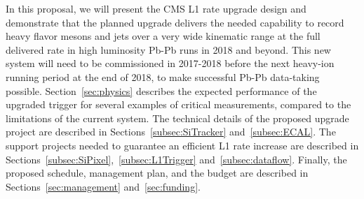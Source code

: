 In this proposal, we will present the CMS L1 rate upgrade design and demonstrate that the planned upgrade delivers the needed capability to record heavy flavor mesons and jets over a very wide kinematic range at the full delivered rate in high luminosity Pb-Pb runs in 2018 and beyond. This new system will need to be commissioned in 2017-2018 before the next heavy-ion running period at the end of 2018, to make successful Pb-Pb data-taking possible. Section~\ref{sec:physics} describes the expected performance of the upgraded trigger for several examples of critical measurements, compared to the limitations of the current system. The technical details of the proposed upgrade project are described in Sections~\ref{subsec:SiTracker} and~\ref{subsec:ECAL}. The support projects needed to guarantee an efficient L1 rate increase are described in Sections~\ref{subsec:SiPixel},~\ref{subsec:L1Trigger} and~\ref{subsec:dataflow}. Finally, the proposed schedule, management plan, and the budget are described in Sections~\ref{sec:management} and~\ref{sec:funding}.

